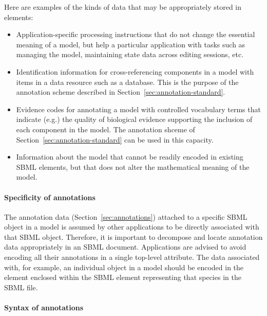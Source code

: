 Here are examples of the kinds of data that may be appropriately
stored in  elements: 
\begin{itemize}

\item Application-specific processing instructions that do not
  change the essential meaning of a model, but help a particular
  application with tasks such as managing the model, maintaining
  state data across editing sessions, etc.

\item Identification information for cross-referencing components
  in a model with items in a data resource such as a database.
  This is the purpose of the annotation scheme described in
  Section~\ref{sec:annotation-standard}.

\item Evidence codes for annotating a model with controlled
  vocabulary terms that indicate (e.g.) the quality of biological
  evidence supporting the inclusion of each component in the
  model.  The annotation shceme of
  Section~\ref{sec:annotation-standard} can be used in this
  capacity.

\item Information about the model that cannot be readily encoded
  in existing SBML elements, but that does not alter the
  mathematical meaning of the model.

\end{itemize}


\paragraph{Specificity of annotations}

The annotation data (Section~\ref{sec:annotations}) attached to a
specific SBML object in a model is assumed by other applications
to be directly associated with that SBML object.  Therefore, it is
important to decompose and locate annotation data appropriately in
an SBML document.  Applications are advised to avoid encoding all
their annotations in a single top-level attribute.  The data
associated with, for example, an individual \Species object in a
model should be encoded in the  element
enclosed within the SBML  element representing
that species in the SBML file.


\paragraph{Syntax of annotations}

